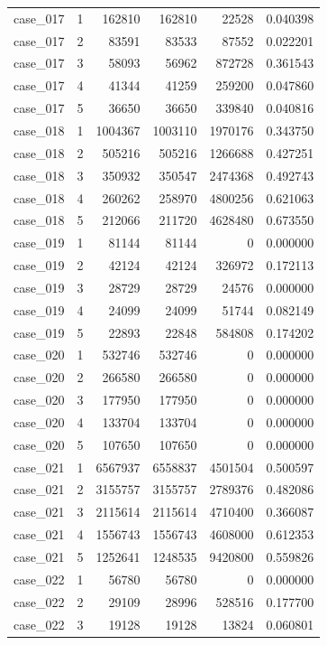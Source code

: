 \begin{longtable}{lrrrrr}
case\_017 & 1 & 162810 & 162810 & 22528 & 0.040398 \\
case\_017 & 2 & 83591 & 83533 & 87552 & 0.022201 \\
case\_017 & 3 & 58093 & 56962 & 872728 & 0.361543 \\
case\_017 & 4 & 41344 & 41259 & 259200 & 0.047860 \\
case\_017 & 5 & 36650 & 36650 & 339840 & 0.040816 \\
case\_018 & 1 & 1004367 & 1003110 & 1970176 & 0.343750 \\
case\_018 & 2 & 505216 & 505216 & 1266688 & 0.427251 \\
case\_018 & 3 & 350932 & 350547 & 2474368 & 0.492743 \\
case\_018 & 4 & 260262 & 258970 & 4800256 & 0.621063 \\
case\_018 & 5 & 212066 & 211720 & 4628480 & 0.673550 \\
case\_019 & 1 & 81144 & 81144 & 0 & 0.000000 \\
case\_019 & 2 & 42124 & 42124 & 326972 & 0.172113 \\
case\_019 & 3 & 28729 & 28729 & 24576 & 0.000000 \\
case\_019 & 4 & 24099 & 24099 & 51744 & 0.082149 \\
case\_019 & 5 & 22893 & 22848 & 584808 & 0.174202 \\
case\_020 & 1 & 532746 & 532746 & 0 & 0.000000 \\
case\_020 & 2 & 266580 & 266580 & 0 & 0.000000 \\
case\_020 & 3 & 177950 & 177950 & 0 & 0.000000 \\
case\_020 & 4 & 133704 & 133704 & 0 & 0.000000 \\
case\_020 & 5 & 107650 & 107650 & 0 & 0.000000 \\
case\_021 & 1 & 6567937 & 6558837 & 4501504 & 0.500597 \\
case\_021 & 2 & 3155757 & 3155757 & 2789376 & 0.482086 \\
case\_021 & 3 & 2115614 & 2115614 & 4710400 & 0.366087 \\
case\_021 & 4 & 1556743 & 1556743 & 4608000 & 0.612353 \\
case\_021 & 5 & 1252641 & 1248535 & 9420800 & 0.559826 \\
case\_022 & 1 & 56780 & 56780 & 0 & 0.000000 \\
case\_022 & 2 & 29109 & 28996 & 528516 & 0.177700 \\
case\_022 & 3 & 19128 & 19128 & 13824 & 0.060801 \\

\end{longtable}
